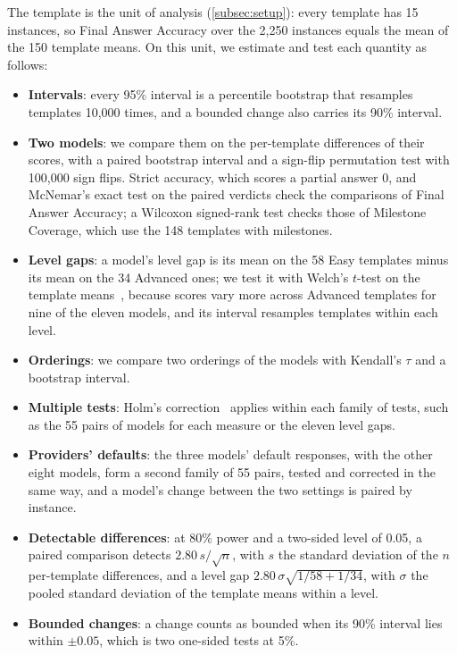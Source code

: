 The template is the unit of analysis (\autoref{subsec:setup}): every template has 15 instances, so
Final Answer Accuracy over the 2,250 instances equals the mean of the 150 template means.
On this unit, we estimate and test each quantity as follows:
\begin{itemize}
    \item \textbf{Intervals}: every 95\% interval is a percentile bootstrap that resamples templates
    10,000 times, and a bounded change also carries its 90\% interval.
    \item \textbf{Two models}: we compare them on the per-template differences of their scores, with
    a paired bootstrap interval and a sign-flip permutation test with 100,000 sign flips.
    Strict accuracy, which scores a partial answer 0, and McNemar's exact test on the paired
    verdicts check the comparisons of Final Answer Accuracy; a Wilcoxon signed-rank test checks
    those of Milestone Coverage, which use the 148 templates with milestones.
    \item \textbf{Level gaps}: a model's level gap is its mean on the 58 Easy templates minus its
    mean on the 34 Advanced ones; we test it with Welch's $t$-test on the template
    means~\citep{welch1947generalization}, because scores vary more across Advanced templates for
    nine of the eleven models, and its interval resamples templates within each level.
    \item \textbf{Orderings}: we compare two orderings of the models with Kendall's $\tau$ and a
    bootstrap interval.
    \item \textbf{Multiple tests}: Holm's correction~\citep{holm1979simple} applies within each
    family of tests, such as the 55 pairs of models for each measure or the eleven level gaps.
    \item \textbf{Providers' defaults}: the three models' default responses, with the other eight
    models, form a second family of 55 pairs, tested and corrected in the same way, and a model's
    change between the two settings is paired by instance.
    \item \textbf{Detectable differences}: at 80\% power and a two-sided level of 0.05, a paired
    comparison detects $2.80\,s/\sqrt{n}$, with $s$ the standard deviation of the $n$ per-template
    differences, and a level gap $2.80\,\sigma\sqrt{1/58 + 1/34}$, with $\sigma$ the pooled
    standard deviation of the template means within a level.
    \item \textbf{Bounded changes}: a change counts as bounded when its 90\% interval lies within
    $\pm 0.05$, which is two one-sided tests at 5\%.
\end{itemize}
